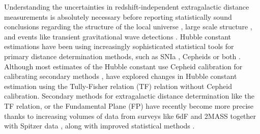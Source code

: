 \documentclass[a4paper,fleqn,usenatbib]{mnras}
\begin{document}
Understanding the uncertainties in redshift-independent extragalactic distance measurements is absolutely necessary before reporting statistically sound conclusions regarding the structure of the local universe \citep{void,locunivcf,nongauss,6df,localunipv,said,gg3500}, large scale structure \citep{anishub,gallargescale,morphanis,tecciencia,bayesh}, and events like transient gravitational wave detections \citep{gwgallist}. Hubble constant estimations have been using increasingly sophisticated statistical tools for primary distance determination methods, such as SNIa \citep{ridsn,unity,hubsn2018}, Cepheids \citet{hubngc} or both \citep{riess}. Although most estimates of the Hubble constant use Cepheid calibration for calibrating secondary methods \citep{hubunc,huborig,hub2010}, \citet{noceph} have explored changes in Hubble constant estimation using the Tully-Fisher relation (TF) relation without Cepheid calibration. Secondary methods for extragalactic distance determination like the TF relation, or the Fundamental Plane (FP) have recently become more precise thanks to increasing volumes of data from surveys like 6dF \citep{6df}  and  2MASS \citep{2mass,tf07dist} together with Spitzer data \citep{sorce}, along with improved statistical methods \citep{precisetf}. \\
\end{document}

